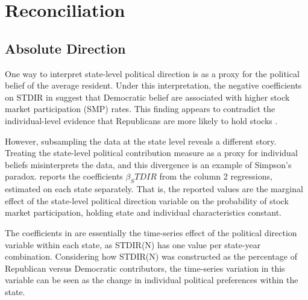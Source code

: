 
\section{Reconciliation}
\label{sec:reconc}

\subsection{Absolute Direction}
\label{sec:reconc_dir}

One way to interpret state-level political direction is as a proxy for the political belief of the average resident. Under this interpretation, the negative coefficients on STDIR in  suggest that Democratic belief are associated with higher stock market participation (SMP) rates. This finding appears to contradict the individual-level evidence that Republicans are more likely to hold stocks \citep{kaustia2011, ke2024}. 

However, subsampling the data at the state level reveals a different story. Treating the state-level political contribution measure as a proxy for individual beliefs misinterprets the data, and this divergence is an example of Simpson's paradox.  reports the coefficients $\beta_STDIR$ from the   column 2 regressions, estimated on each state separately. That is, the reported values are the marginal effect of the state-level political direction variable on the probability of stock market participation, holding state and individual characteristics constant. 

The coefficients in  are essentially the time-series effect of the political direction variable within each state, as STDIR(N) has one value per state-year combination. Considering how STDIR(N) was constructed as the percentage of Republican versus Democratic contributors, the time-series variation in this variable can be seen as the change in individual political preferences within the state.


